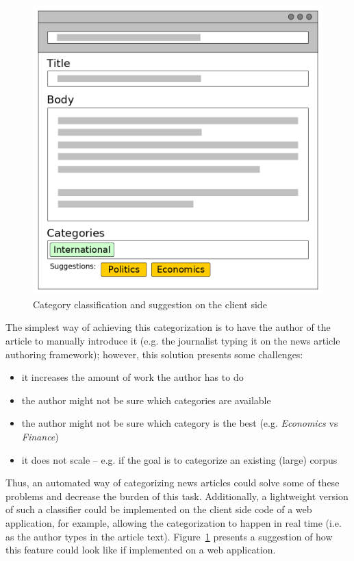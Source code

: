 \documentclass[conference]{IEEEtran}
\begin{document}
\begin{figure}[htbp]
\centerline{\includegraphics[width=.97\columnwidth]{imgs/wireframe}}
\caption{Category classification and suggestion on the client side}
\label{fig:wireframe}
\end{figure}


The simplest way of achieving this categorization is to have the
author of the article to manually introduce it (e.g. the journalist
typing it on the news article authoring framework); however, this
solution presents some challenges:
\begin{itemize}
    \item it increases the amount of work the author has to do
    \item the author might not be sure which categories are available
    \item the author might not be sure which category is the best
        (e.g. \emph{Economics} vs  \emph{Finance})
    \item it does not scale -- e.g. if the goal is to categorize an
        existing (large) corpus
\end{itemize}

Thus, an automated way of categorizing news articles could solve some
of these problems and decrease the burden of this task. Additionally,
a lightweight version of such a classifier could be implemented on the
client side code of a web application, for example, allowing the
categorization to happen in real time (i.e. as the author types in the
article text). Figure~\ref{fig:wireframe} presents a suggestion of
how this feature could look like if implemented on a web application.
\end{document}
